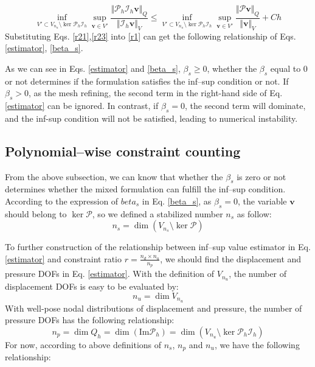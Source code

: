 \begin{pf}
\begin{equation}\label{r23}
    \inf_{V'\subset V_{n_u}\setminus \ker \mathcal P_h \mathcal I_h} \sup_{\boldsymbol v \in V'} \frac{\Vert \mathcal P_h\mathcal I_h\boldsymbol v\Vert_Q}{\Vert \mathcal I_h \boldsymbol v\Vert_V} 
    \le \inf_{V'\subset V_{n_u}\setminus \ker \mathcal P_h \mathcal I_h} \sup_{\boldsymbol v \in V'} \frac{\Vert \mathcal P \boldsymbol v\Vert_Q}{\Vert \boldsymbol v\Vert_V} + Ch 
\end{equation}
Substituting Eqs. \eqref{r21},\eqref{r23} into \eqref{r1} can get the following relationship of Eqs. \eqref{estimator}, \eqref{beta_s}.
\end{pf}

As we can see in Eqs. \eqref{estimator} and \eqref{beta_s},
$\beta_s \ge 0$, whether the $\beta_s$ equal to $0$ or not determines if the formulation satisfies the inf--sup condition or not.
If $\beta_s > 0$, as the mesh refining, the second term in the right-hand side of Eq. \eqref{estimator} can be ignored. In contrast, if $\beta_s = 0$, the second term will dominate, and the inf-sup condition will not be satisfied, leading to numerical instability.

\subsection{Polynomial--wise constraint counting}

From the above subsection, we can know that whether the $\beta_s$ is zero or not determines whether the mixed formulation can fulfill the inf--sup condition.
According to the expression of $beta_s$ in Eq. \eqref{beta_s},
as $\beta_s = 0$, the variable $\boldsymbol v$ should belong to $\ker \mathcal P$, so we defined a stabilized number $n_s$ as follow:
\begin{equation}
    n_s = \dim(V_{n_s}\setminus \ker \mathcal P)
\end{equation}

To further construction of the relationship between inf--sup value estimator in Eq. \eqref{estimator} and constraint ratio $r = \frac{n_d\times n_u}{n_p}$,  
we should find the displacement and pressure DOFs in Eq. \eqref{estimator}.
With the definition of $V_{n_u}$, the number of displacement DOFs is easy to be evaluated by:
\begin{equation}
    n_u = \dim V_{n_u}
\end{equation}
With well-pose nodal distributions of displacement and pressure, the number of pressure DOFs has the following relationship:
\begin{equation}
    n_p = \dim Q_h = \dim (\mathrm{Im} \mathcal P_h)
    = \dim (V_{n_u}\setminus \ker \mathcal P_h \mathcal I_h)
\end{equation}
For now, according to above definitions of $n_s$, $n_p$ and $n_u$, we have the following relationship:

